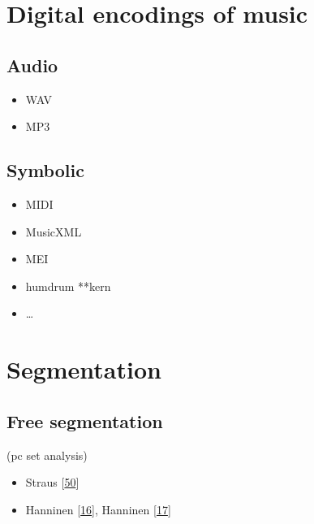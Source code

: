 \documentclass[letterpaper,10pt,english]{sphinxmanual}
\begin{document}
\chapter{Digital encodings of music}
\label{\detokenize{encodings:digital-encodings-of-music}}\label{\detokenize{encodings::doc}}

\section{Audio}
\label{\detokenize{encodings:audio}}\begin{itemize}
\item {} 
\sphinxAtStartPar
WAV

\item {} 
\sphinxAtStartPar
MP3

\end{itemize}


\section{Symbolic}
\label{\detokenize{encodings:symbolic}}\begin{itemize}
\item {} 
\sphinxAtStartPar
MIDI

\item {} 
\sphinxAtStartPar
MusicXML

\item {} 
\sphinxAtStartPar
MEI

\item {} 
\sphinxAtStartPar
humdrum **kern

\item {} 
\sphinxAtStartPar
…

\end{itemize}


\chapter{Segmentation}
\label{\detokenize{5_segmentation:segmentation}}\label{\detokenize{5_segmentation::doc}}

\section{Free segmentation}
\label{\detokenize{5_segmentation:free-segmentation}}
\sphinxAtStartPar
(pc set analysis)
\begin{itemize}
\item {} 
\sphinxAtStartPar
Straus {[}\hyperlink{cite.8_bibliography:id3}{50}{]}

\item {} 
\sphinxAtStartPar
Hanninen {[}\hyperlink{cite.8_bibliography:id42}{16}{]}, Hanninen {[}\hyperlink{cite.8_bibliography:id43}{17}{]}

\end{itemize}
\end{document}
